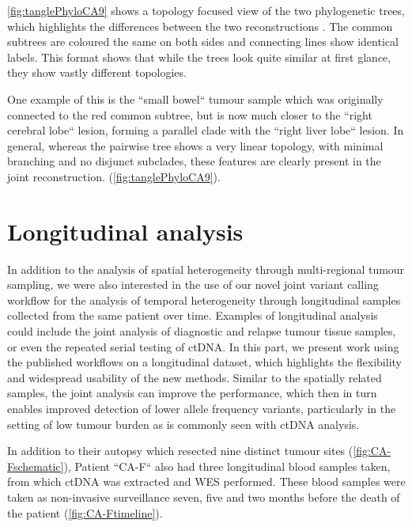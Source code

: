 \autoref{fig:tanglePhyloCA9} shows a topology focused view of the two phylogenetic trees, which highlights the differences between the two reconstructions \cite{Vienne2018}. The common subtrees are coloured the same on both sides and connecting lines show identical labels. This format shows that while the trees look quite similar at first glance, they show vastly different topologies.


One example of this is the ``small bowel`` tumour sample which was originally connected to the red common subtree, but is now much closer to the ``right cerebral lobe`` lesion, forming a parallel clade with the ``right liver lobe`` lesion. In general, whereas the pairwise tree shows a very linear topology, with minimal branching and no disjunct subclades, these features are clearly present in the joint reconstruction.  (\autoref{fig:tanglePhyloCA9}).


\section[Longitudinal analysis]{Longitudinal analysis}
\label{variantcalling-sec:longitudinal}

In addition to the analysis of spatial heterogeneity through multi-regional tumour sampling, we were also interested in the use of our novel joint variant calling workflow for the analysis of temporal heterogeneity through longitudinal samples collected from the same patient over time. Examples of longitudinal analysis could include the joint analysis of diagnostic and relapse tumour tissue samples, or even the repeated serial testing of ctDNA. In this part, we present work using the published workflows on a longitudinal dataset, which highlights the flexibility and widespread usability of the new methods. Similar to the spatially related samples, the joint analysis can improve the performance, which then in turn enables improved detection of lower allele frequency variants, particularly in the setting of low tumour burden as is commonly seen with ctDNA analysis.

In addition to their autopsy which resected nine distinct tumour sites (\autoref{fig:CA-Fschematic}), Patient ``CA-F`` also had three longitudinal blood samples taken, from which ctDNA was extracted and WES performed. These blood samples were taken as non-invasive surveillance seven, five and two months before the death of the patient (\autoref{fig:CA-Ftimeline}).

